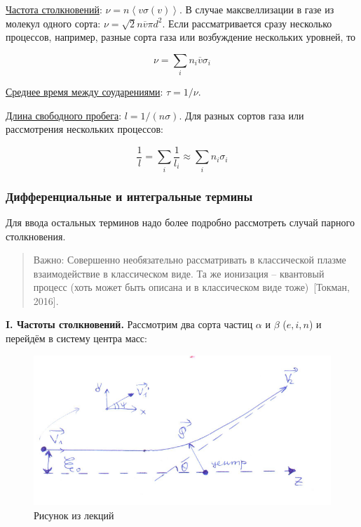 \documentclass[10pt, a4paper]{article}
\newcommand{\Tokman}{~[Токман, 2016]}
\begin{document}
\uline{Частота столкновений}: $\nu = n\left\langle v\sigma(v)\right\rangle $. В случае максвеллизации в газе из молекул одного сорта: $\nu = \sqrt{2}n\overline{v}\pi d^2$. 
Если рассматривается сразу несколько процессов, например, разные сорта газа или возбуждение нескольких уровней, то

\begin{equation*}
	\nu = \sum_{i}n_i\overline{v}\sigma_i
\end{equation*}

\uline{Среднее время между соударениями}: $\tau = 1/\nu$.

\uline{Длина свободного пробега}: $l = 1/(n\sigma)$.
Для разных сортов газа или рассмотрения нескольких процессов:

\begin{equation*}
	\frac{1}{l} = \sum_{i}\frac{1}{l_i}\approx\sum_{i}n_i\sigma_i
\end{equation*}

\subsubsection{Дифференциальные и интегральные термины}

Для ввода остальных терминов надо более подробно рассмотреть случай парного столкновения.	

\begin{quotation}
	Важно: Совершенно необязательно рассматривать в классической плазме взаимодействие в классическом виде. Та же ионизация -- квантовый процесс (хоть может быть описана и в классическом виде тоже)\Tokman.
\end{quotation}

{\bfseries \large I. Частоты столкновений.} Рассмотрим два сорта частиц $\alpha$ и $\beta$ ($e, i, n$) и перейдём в систему центра масс:

\begin{figure}[ht]
	\begin{center}
		\includegraphics[width=0.6\linewidth]{scattering_simple.pdf}
	\end{center}
	\caption{Рисунок из лекций}
	\label{fig:scattering}
\end{figure}
\end{document}
